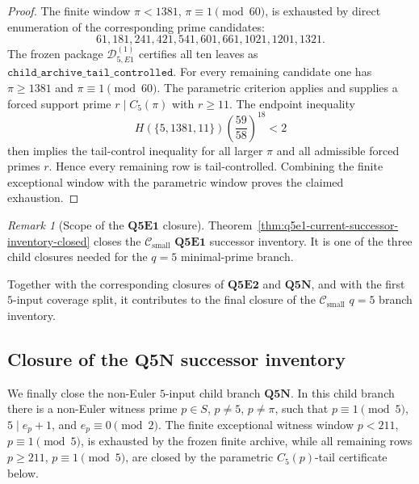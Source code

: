 \documentclass[11pt]{article}
\theoremstyle{definition}
\theoremstyle{remark}
\newtheorem{remark}[theorem]{Remark}
\newcommand{\Csmall}{\ensuremath{\mathcal C_{\mathrm{small}}}}
\begin{document}
\begin{proof}
The finite window \(\pi<1381\), \(\pi\equiv1\pmod{60}\), is exhausted by direct
enumeration of the corresponding prime candidates:
\[
  61,181,241,421,541,601,661,1021,1201,1321.
\]
The frozen package \(\mathcal D_{5,E1}^{(1)}\) certifies all ten leaves as
\(\mathtt{child\_archive\_tail\_controlled}\).  For every remaining candidate
one has \(\pi\ge1381\) and \(\pi\equiv1\pmod{60}\).  The parametric criterion
applies and supplies a forced support prime \(r\mid C_5(\pi)\) with \(r\ge11\).
The endpoint inequality
\[
  H(\{5,1381,11\})
  \left(\frac{59}{58}\right)^{18}<2
\]
then implies the tail-control inequality for all larger \(\pi\) and all
admissible forced primes \(r\).  Hence every remaining row is tail-controlled.
Combining the finite exceptional window with the parametric window proves the
claimed exhaustion.
\end{proof}

\begin{remark}[Scope of the \(\mathbf{Q5E1}\) closure]
\label{rem:scope-q5e1-current-successor-inventory-closed}
Theorem~\ref{thm:q5e1-current-successor-inventory-closed} closes the
\(\Csmall\) \(\mathbf{Q5E1}\) successor inventory.  It is one of the three child
closures needed for the \(q=5\) minimal-prime branch.

Together with the corresponding closures of \(\mathbf{Q5E2}\) and
\(\mathbf{Q5N}\), and with the first \(5\)-input coverage split, it contributes
to the final closure of the \(\Csmall\) \(q=5\) branch inventory.
\end{remark}

\subsection{Closure of the \(\mathbf{Q5N}\) successor inventory}

We finally close the non-Euler \(5\)-input child branch
\(\mathbf{Q5N}\).  In this child branch there is a non-Euler witness prime
\(p\in S\), \(p\ne5\), \(p\ne\pi\), such that \(p\equiv1\pmod5\),
\(5\mid e_p+1\), and \(e_p\equiv0\pmod2\).  The finite exceptional witness
window \(p<211\), \(p\equiv1\pmod5\), is exhausted by the frozen finite archive,
while all remaining rows \(p\ge211\), \(p\equiv1\pmod5\), are closed by the
parametric \(C_5(p)\)-tail certificate below.
\end{document}
